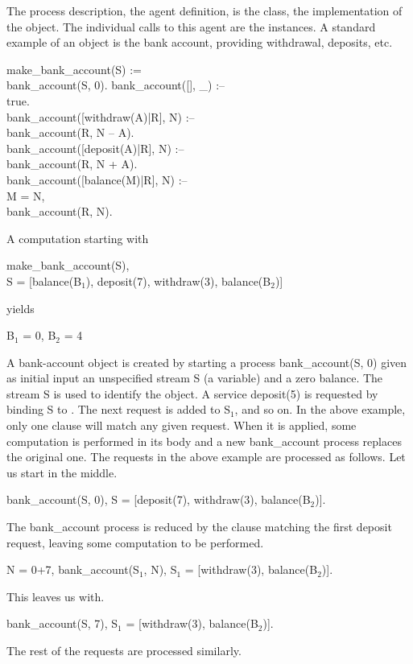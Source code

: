The process description, the agent definition, is the class, the
implementation of the object.  The individual calls to this agent are
the instances.  A standard example of an object is the bank account,
providing withdrawal, deposits, etc.
%
\begin{program}
make_bank_account(S) := \\
\>\>	bank_account(S, 0).  \nl
bank_account([], _) :-- \\
\>\cond\>	true.  \\
bank_account([withdraw(A)|R], N) :-- \\
\>\cond\>	bank_account(R, N -- A).  \\
bank_account([deposit(A)|R], N) :-- \\
\>\cond\>	bank_account(R, N + A).  \\
bank_account([balance(M)|R], N) :-- \\
\>\cond\>	M = N, \\
\>\>	bank_account(R, N).
\end{program}%
%
A computation starting with
%
\begin{progex}
make_bank_account(S), \\
S = [balance(B$_1$), deposit(7), withdraw(3), balance(B$_2$)]
\end{progex}%
%
yields
%
\begin{progex}
B$_1$ = 0, B$_2$ = 4
\end{progex}%
%
A bank-account object is created by starting a process {\prog
bank_account(S, 0)} given as initial input an unspecified stream
{\prog S} (a variable) and a zero balance.  The stream {\prog S} is
used to identify the object.  A service {\prog deposit(5)} is
requested by binding {\prog S} to {\prog [deposit(5)|S$_1$]}.  The
next request is added to {\prog S$_1$}, and so on.  In the above
example, only one clause will match any given request.  When it is
applied, some computation is performed in its body and a new {\prog
bank_account} process replaces the original one.  The requests in the
above example are processed as follows.  Let us start in the middle.
%
\begin{progex}
bank_account(S, 0), S = [deposit(7), withdraw(3), balance(B$_2$)].
\end{progex}%
%
The {\prog bank_account} process is reduced by the clause matching the
first deposit request, leaving some computation to be performed.
%
\begin{progex}
N = 0+7, bank_account(S$_1$, N), S$_1$ = [withdraw(3), balance(B$_2$)].
\end{progex}%
%
This leaves us with.
%
\begin{progex}
bank_account(S, 7), S$_1$ = [withdraw(3), balance(B$_2$)].
\end{progex}%
%
The rest of the requests are processed similarly.

